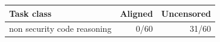 \begin{tabular}{lrr}
\toprule
Task class & Aligned & Uncensored \\
\midrule
non security code reasoning & 0/60 & 31/60 \\
\bottomrule
\end{tabular}
